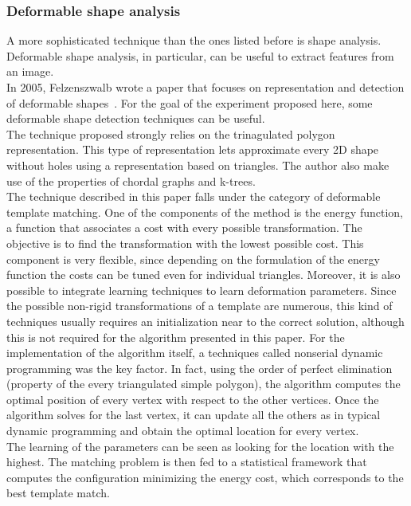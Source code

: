 \documentclass[conference]{IEEEtran}
\begin{document}
		\subsubsection{Deformable shape analysis}
		
			A more sophisticated technique than the ones listed before is shape analysis. Deformable shape analysis, in particular, can be useful to extract features from an image.\\
			In 2005, Felzenszwalb wrote a paper that focuses on representation and detection of deformable shapes~\cite{5}. For the goal of the experiment proposed here, some deformable shape 
			detection techniques can be useful. \\
			The technique proposed strongly relies on the trinagulated polygon representation. This type of representation lets approximate every 2D shape without holes using a representation based on triangles. 
			The author also make use of the properties of chordal graphs and k-trees.\\
			The technique described in this paper falls under the category of deformable template matching. One of the components of the method is the energy function, a function that associates a cost with every 
			possible transformation. The objective is to find the transformation with the lowest possible cost. This component is very flexible, since depending on the formulation of the energy function the costs 
			can be tuned even for individual triangles. Moreover, it is also possible to integrate learning techniques to learn deformation parameters.
			Since the possible non-rigid transformations of a template are numerous, this kind of techniques usually requires an initialization near to the correct solution, 
			although this is not required for the algorithm presented in this paper. 
			For the implementation of the algorithm itself, a techniques called nonserial dynamic programming was the key factor. In fact, using the order of perfect elimination (property of the every triangulated 
			simple polygon), the algorithm computes the optimal position of every vertex with respect to the other vertices. Once the algorithm solves for the last vertex, it can 
			update all the others as in typical dynamic programming and obtain the optimal location for every vertex.\\
			The learning of the parameters can be seen as looking for the location with the highest. The matching problem is then fed to a statistical framework that computes the configuration minimizing the 
			energy cost, which corresponds to the best template match.
			
\end{document}
